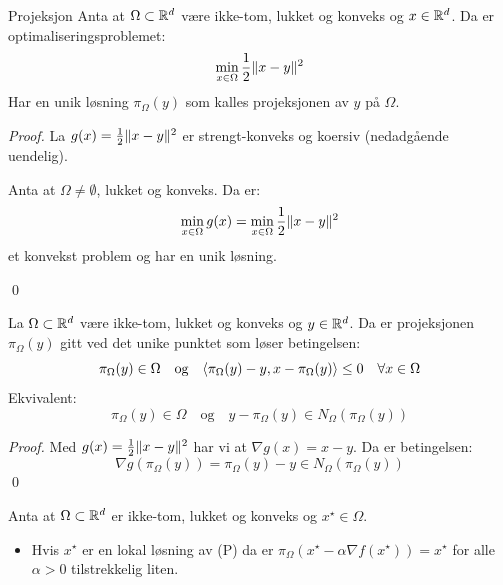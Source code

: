 \begin{lemma}{Projeksjon}{}
  Anta at \(\Omega \subset \mathbb{R}^d\) være ikke-tom, lukket og konveks og \(x \in \mathbb{R}^d\).
  Da er optimaliseringsproblemet:
  \[
    \min_{x \in \Omega} \frac{1}{2} \lVert x - y\rVert^2
  \]
  Har en unik løsning \(\pi_\Omega(y)\) som kalles projeksjonen av \(y\) på \(\Omega\).


\end{lemma}
\begin{proof}{}{}
  La \(g(x) = \frac{1}{2} \lVert x - y\rVert^2\) er strengt-konveks og koersiv (nedadgående uendelig).

  Anta at \(\Omega \neq \emptyset\), lukket og konveks. Da er:
  \[
    \min_{x \in \Omega} g(x) = \min_{x \in \Omega} \frac{1}{2} \lVert x - y\rVert^2
  \]
  et konvekst problem og har en unik løsning.

  \qed
\end{proof}

\begin{proposition}{}{}
  La \(\Omega \subset \mathbb{R}^d\) være ikke-tom, lukket og konveks og \(y \in \mathbb{R}^d\).
  Da er projeksjonen \(\pi_\Omega(y)\) gitt ved det unike punktet som løser betingelsen:
  \[
    \pi_\Omega(y) \in \Omega \quad \text{og} \quad \langle\pi_\Omega(y) - y, x - \pi_\Omega(y)\rangle \leq 0 \quad \forall x \in \Omega
  \]
  Ekvivalent:
  \[
    \pi_\Omega(y) \in \Omega \quad \text{og} \quad y - \pi_\Omega(y) \in N_\Omega(\pi_\Omega(y))
  \]

\end{proposition}

\begin{proof}{}{}
  Med \(g(x) = \frac{1}{2} \lVert x - y\rVert^2\) har vi at \(\nabla g(x) = x - y\).
  Da er betingelsen:
  \[
    \nabla g(\pi_\Omega(y)) = \pi_\Omega(y) - y \in N_\Omega(\pi_\Omega(y))
  \]
  \qed
\end{proof}

\begin{proposition}{}{}
  Anta at \(\Omega \subset \mathbb{R}^d\) er ikke-tom, lukket og konveks og \(x^\star \in \Omega\).
  \begin{itemize}
    \item Hvis \(x^\star\) er en lokal løsning av (P) da er \(\pi_\Omega(x^\star - \alpha \nabla f(x^\star)) = x^\star\) for alle \(\alpha > 0\) tilstrekkelig liten.
  \end{itemize}
\end{proposition}

